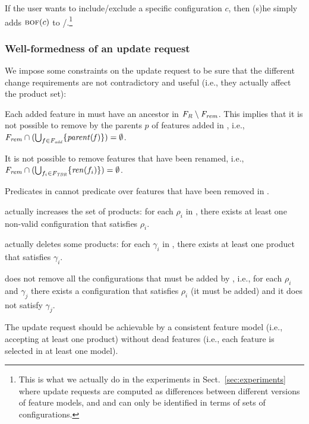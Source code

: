 \begin{tikzborder}{\cite{Gargantini16:validation}}
\begin{tikzborder}{\cite{gargantini_combinatorial_2017}}
\begin{tikzborder}{\cite{garn2019}}
\begin{tikzborder}{\cite{arcaini2019achieving}}
	If the user wants to include/exclude a specific configuration $c$, then (s)he simply adds $\textsc{bof}(c)$ to \CFrelax/\CFrem.\footnote{This is what we actually do in the experiments in Sect.~\ref{sec:experiments} where update requests are computed as differences between different versions of feature models, and \CFrelax and \CFrem can only be identified in terms of sets of configurations.}\be
	
	\subsubsection{Well-formedness of an update request}\label{sec:wfUpdReq}
	
	\bb We impose some constraints on the update request to be sure that the different change requirements are not contradictory and useful (i.e., they actually affect the product set):
	\begin{compactenum}
		\item \label{item:notCicleParentAndNotRemPar} Each added feature in \Fadd must have an ancestor in $\mathit{F_R}\setminus\mathit{F_{rem}}$. This implies that it is not possible to remove by \Frem the parents $p$ of features added in \Fadd, i.e., $\mathit{F_{rem}} \cap (\bigcup_{f \in \mathit{F_{add}}} \{\mathit{parent(f)}\}) = \emptyset$.
		\item \label{item:notRemRen} It is not possible to remove features that have been renamed, i.e., $\mathit{F_{rem}} \cap (\bigcup_{f_i \in \mathit{F_{TBR}}} \{\mathit{ren}(f_i)\}) = \emptyset$.
		\item \label{item:relaxNotRemFeat} Predicates in \CFrelax cannot predicate over features that have been removed in \Frem.
		\item \label{item:relaxEffective} \CFrelax actually increases the set of products: for each $\rho_i$ in \CFrelax, there exists at least one non-valid configuration that satisfies $\rho_i$.
		\item \label{item:remEffective} \CFrem actually deletes some products: for each $\gamma_i$ in \CFrem, there exists at least one product that satisfies $\gamma_i$.
		\item \label{item:remNotBossy} \CFrem does not remove all the configurations that must be added by \CFrelax, i.e., for each $\rho_i$ and $\gamma_j$ there exists a configuration that satisfies $\rho_i$ (it must be added) and it does not satisfy $\gamma_j$.
		\item \label{item:notIncons} The update request should be achievable by a consistent feature model (i.e., accepting at least one product) without dead features (i.e., each feature is selected in at least one model).
	\end{compactenum}
	

\end{tikzborder}
\end{tikzborder}
\end{tikzborder}
\end{tikzborder}
